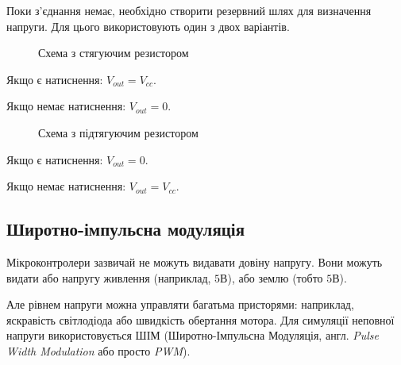 \documentclass[12pt,a4paper]{report}  %
\begin{document}
Поки з'єднання немає, необхідно створити резервний шлях для визначення напруги. Для цього використовують один з двох варіантів.

\begin{figure}[h!]
\caption{Схема з стягуючим резистором}
\label{ris:image}
\end{figure}

Якщо є натиснення: $V_{out} = V_{cc}$.

Якщо немає натиснення: $V_{out} = 0$.


\begin{figure}[h!]
\caption{Схема з підтягуючим резистором}
\label{ris:image}
\end{figure}

Якщо є натиснення: $V_{out} = 0$.

Якщо немає натиснення: $V_{out} = V_{cc}$.

\subsection{Широтно-імпульсна модуляція}

Мікроконтролери зазвичай не можуть видавати довіну напругу. Вони можуть видати або напругу живлення (наприклад, $5\text{В}$), або землю (тобто $5\text{В}$).

Але рівнем напруги можна управляти багатьма присторями: наприклад, яскравість світлодіода або швидкість обертання мотора. Для симуляції неповної напруги використовується ШІМ (Широтно-Імпульсна Модуляція, англ. \textit{Pulse Width Modulation} або просто \textit{PWM}).
\end{document}
